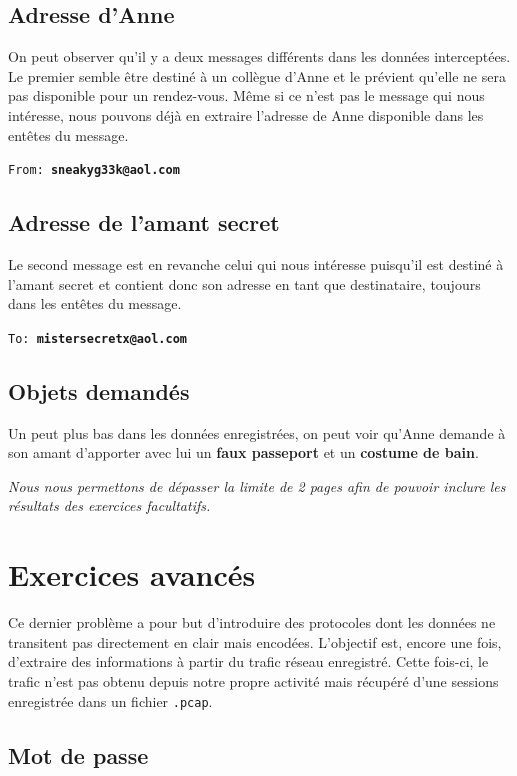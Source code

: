 \documentclass[11pt,a4paper]{article}
\begin{document}
\subsection{Adresse d'Anne}

On peut observer qu'il y a deux messages différents dans les données interceptées. Le premier semble être destiné à un collègue d'Anne et le prévient qu'elle ne sera pas disponible pour un rendez-vous. Même si ce n'est pas le message qui nous intéresse, nous pouvons déjà en extraire l'adresse de Anne disponible dans les entêtes du message.

\texttt{From: \textbf{sneakyg33k@aol.com}}

\subsection{Adresse de l'amant secret}

Le second message est en revanche celui qui nous intéresse puisqu'il est destiné à l'amant secret et contient donc son adresse en tant que destinataire, toujours dans les entêtes du message.

\texttt{To: \textbf{mistersecretx@aol.com}}

\subsection{Objets demandés}

Un peut plus bas dans les données enregistrées, on peut voir qu'Anne demande à son amant d'apporter avec lui un \textbf{faux passeport} et un \textbf{costume de bain}.

\newpage

\emph{\footnotesize 
Nous nous permettons de dépasser la limite de 2 pages afin de pouvoir inclure les résultats des exercices facultatifs.
}

\section{Exercices avancés}

Ce dernier problème a pour but d'introduire des protocoles dont les données ne transitent pas directement en clair mais encodées. L'objectif est, encore une fois, d'extraire des informations à partir du trafic réseau enregistré. Cette fois-ci, le trafic n'est pas obtenu depuis notre propre activité mais récupéré d'une sessions enregistrée dans un fichier \texttt{.pcap}.

\subsection{Mot de passe}
\end{document}
